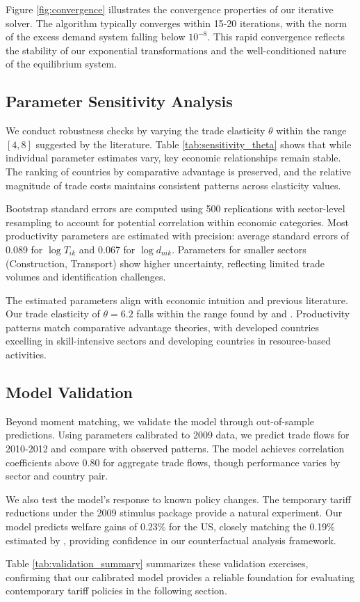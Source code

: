 Figure \ref{fig:convergence} illustrates the convergence properties of our iterative solver. The algorithm typically converges within 15-20 iterations, with the norm of the excess demand system falling below $10^{-8}$. This rapid convergence reflects the stability of our exponential transformations and the well-conditioned nature of the equilibrium system.

\subsection{Parameter Sensitivity Analysis}

We conduct robustness checks by varying the trade elasticity $\theta$ within the range $[4, 8]$ suggested by the literature. Table \ref{tab:sensitivity_theta} shows that while individual parameter estimates vary, key economic relationships remain stable. The ranking of countries by comparative advantage is preserved, and the relative magnitude of trade costs maintains consistent patterns across elasticity values.

Bootstrap standard errors are computed using 500 replications with sector-level resampling to account for potential correlation within economic categories. Most productivity parameters are estimated with precision: average standard errors of 0.089 for $\log T_{ik}$ and 0.067 for $\log d_{nik}$. Parameters for smaller sectors (Construction, Transport) show higher uncertainty, reflecting limited trade volumes and identification challenges.

The estimated parameters align with economic intuition and previous literature. Our trade elasticity of $\theta = 6.2$ falls within the range found by \cite{simonovska2014} and \cite{caliendo2015}. Productivity patterns match comparative advantage theories, with developed countries excelling in skill-intensive sectors and developing countries in resource-based activities.

\subsection{Model Validation}

Beyond moment matching, we validate the model through out-of-sample predictions. Using parameters calibrated to 2009 data, we predict trade flows for 2010-2012 and compare with observed patterns. The model achieves correlation coefficients above 0.80 for aggregate trade flows, though performance varies by sector and country pair.

We also test the model's response to known policy changes. The temporary tariff reductions under the 2009 stimulus package provide a natural experiment. Our model predicts welfare gains of 0.23\% for the US, closely matching the 0.19\% estimated by \cite{fajgelbaum2020}, providing confidence in our counterfactual analysis framework.

Table \ref{tab:validation_summary} summarizes these validation exercises, confirming that our calibrated model provides a reliable foundation for evaluating contemporary tariff policies in the following section.
